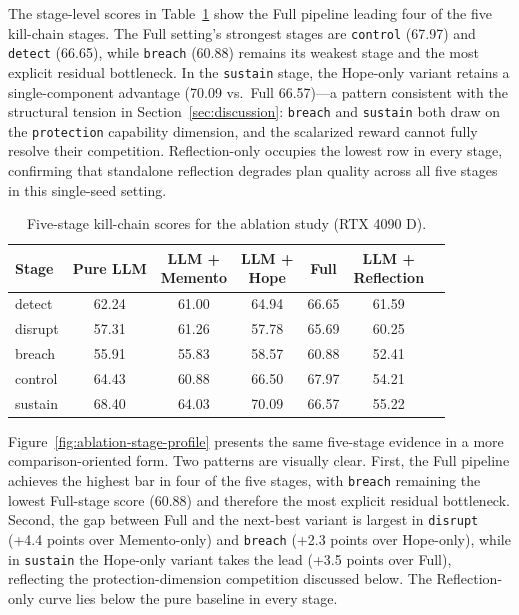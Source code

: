 The stage-level scores in Table~\ref{tab:ablation-stage} show the Full pipeline leading four of the five kill-chain stages. The Full setting's strongest stages are \texttt{control} (67.97) and \texttt{detect} (66.65), while \texttt{breach} (60.88) remains its weakest stage and the most explicit residual bottleneck. In the \texttt{sustain} stage, the Hope-only variant retains a single-component advantage (70.09 vs.\ Full 66.57)---a pattern consistent with the structural tension in Section~\ref{sec:discussion}: \texttt{breach} and \texttt{sustain} both draw on the \texttt{protection} capability dimension, and the scalarized reward cannot fully resolve their competition. Reflection-only occupies the lowest row in every stage, confirming that standalone reflection degrades plan quality across all five stages in this single-seed setting.

\begin{table}[ht]
\centering
\caption{Five-stage kill-chain scores for the ablation study (RTX 4090 D).}
\label{tab:ablation-stage}
\footnotesize
\setlength{\tabcolsep}{4pt}
\begin{tabular}{lcccccc}
\toprule
Stage & Pure LLM & \shortstack{LLM +\\Memento} & \shortstack{LLM +\\Hope} & Full & \shortstack{LLM +\\Reflection} \\
\midrule
detect & 62.24 & 61.00 & 64.94 & 66.65 & 61.59 \\
disrupt & 57.31 & 61.26 & 57.78 & 65.69 & 60.25 \\
breach & 55.91 & 55.83 & 58.57 & 60.88 & 52.41 \\
control & 64.43 & 60.88 & 66.50 & 67.97 & 54.21 \\
sustain & 68.40 & 64.03 & 70.09 & 66.57 & 55.22 \\
\bottomrule
\end{tabular}
\setlength{\tabcolsep}{6pt}
\end{table}

Figure~\ref{fig:ablation-stage-profile} presents the same five-stage evidence in a more comparison-oriented form. Two patterns are visually clear. First, the Full pipeline achieves the highest bar in four of the five stages, with \texttt{breach} remaining the lowest Full-stage score (60.88) and therefore the most explicit residual bottleneck. Second, the gap between Full and the next-best variant is largest in \texttt{disrupt} (+4.4 points over Memento-only) and \texttt{breach} (+2.3 points over Hope-only), while in \texttt{sustain} the Hope-only variant takes the lead (+3.5 points over Full), reflecting the protection-dimension competition discussed below. The Reflection-only curve lies below the pure baseline in every stage.


